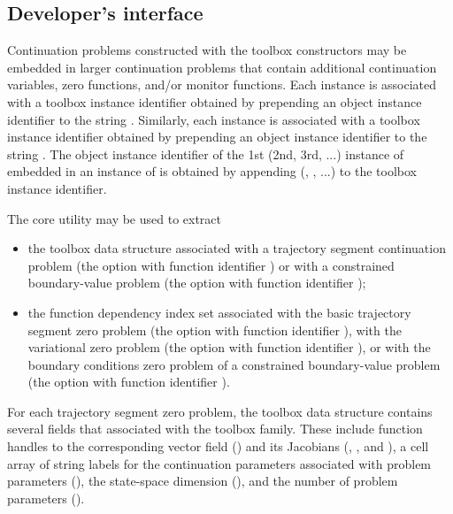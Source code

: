 \subsection{Developer's interface}
Continuation problems constructed with the  toolbox constructors may be embedded in larger continuation problems that contain additional continuation variables, zero functions, and/or monitor functions. Each  instance is associated with a toolbox instance identifier obtained by prepending an object instance identifier to the string . Similarly, each  instance is associated with a toolbox instance identifier obtained by prepending an object instance identifier to the string . The object instance identifier of the 1st (2nd, 3rd, ...) instance of  embedded in an instance of  is obtained by appending  (, , ...) to the  toolbox instance identifier.

The  core utility may be used to extract
\begin{itemize}
\item the toolbox data structure associated with a trajectory segment continuation problem (the  option with function identifier ) or with a constrained boundary-value problem (the  option with function identifier );
\item the function dependency index set associated with the basic trajectory segment zero problem (the  option with function identifier ), with the variational zero problem (the  option with function identifier ), or with the boundary conditions zero problem of a constrained boundary-value problem (the  option with function identifier ).
\end{itemize}
For each trajectory segment zero problem, the toolbox data structure contains several fields that associated with the  toolbox family. These include function handles to the corresponding vector field () and its Jacobians (, , and ), a cell array of string labels for the continuation parameters associated with problem parameters (), the state-space dimension (), and the number of problem parameters ().

